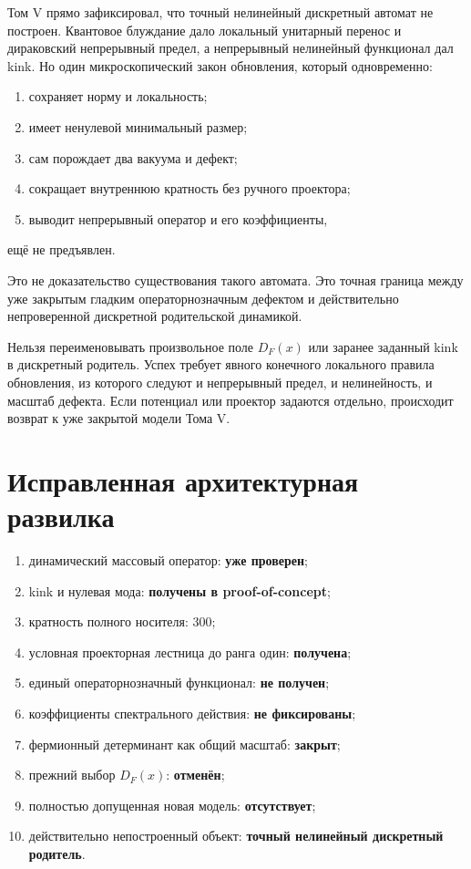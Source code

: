 Том V прямо зафиксировал, что точный нелинейный дискретный автомат не
построен. Квантовое блуждание дало локальный унитарный перенос и дираковский
непрерывный предел, а непрерывный нелинейный функционал дал kink. Но один
микроскопический закон обновления, который одновременно:
\begin{enumerate}
 \item сохраняет норму и локальность;
 \item имеет ненулевой минимальный размер;
 \item сам порождает два вакуума и дефект;
 \item сокращает внутреннюю кратность без ручного проектора;
 \item выводит непрерывный оператор и его коэффициенты,
\end{enumerate}
ещё не предъявлен.

Это не доказательство существования такого автомата. Это точная граница
между уже закрытым гладким операторнозначным дефектом и действительно
непроверенной дискретной родительской динамикой.

\begin{nogocriterion}
Нельзя переименовывать произвольное поле $D_F(x)$ или заранее заданный kink
в дискретный родитель. Успех требует явного конечного локального правила
обновления, из которого следуют и непрерывный предел, и нелинейность, и
масштаб дефекта. Если потенциал или проектор задаются отдельно, происходит
возврат к уже закрытой модели Тома V.
\end{nogocriterion}

\section{Исправленная архитектурная развилка}

\begin{protocol}
\begin{enumerate}
 \item динамический массовый оператор: \textbf{уже проверен};
 \item kink и нулевая мода: \textbf{получены в proof-of-concept};
 \item кратность полного носителя: \textbf{$300$};
 \item условная проекторная лестница до ранга один:
 \textbf{получена};
 \item единый операторнозначный функционал: \textbf{не получен};
 \item коэффициенты спектрального действия: \textbf{не фиксированы};
 \item фермионный детерминант как общий масштаб: \textbf{закрыт};
 \item прежний выбор $D_F(x)$: \textbf{отменён};
 \item полностью допущенная новая модель: \textbf{отсутствует};
 \item действительно непостроенный объект:
 \textbf{точный нелинейный дискретный родитель}.
\end{enumerate}
\end{protocol}

